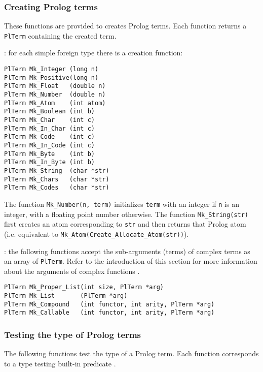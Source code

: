 \subsubsection{Creating Prolog terms}
These functions are provided to creates Prolog terms. Each function returns
a \texttt{PlTerm} containing the created term.

: for each simple foreign type
 there is a creation function:

\begin{Indentation}
\begin{verbatim}
PlTerm Mk_Integer (long n)
PlTerm Mk_Positive(long n)
PlTerm Mk_Float   (double n)
PlTerm Mk_Number  (double n)
PlTerm Mk_Atom    (int atom)
PlTerm Mk_Boolean (int b)
PlTerm Mk_Char    (int c)
PlTerm Mk_In_Char (int c)
PlTerm Mk_Code    (int c)
PlTerm Mk_In_Code (int c)
PlTerm Mk_Byte    (int b)
PlTerm Mk_In_Byte (int b)
PlTerm Mk_String  (char *str)
PlTerm Mk_Chars   (char *str)
PlTerm Mk_Codes   (char *str)
\end{verbatim}
\end{Indentation}

The function \texttt{Mk\_Number(n, term)} initializes \texttt{term} with an
integer if \texttt{n} is an integer, with a floating point number otherwise.
The function \texttt{Mk\_String(str)} first creates an atom corresponding to
\texttt{str} and then returns that Prolog atom (i.e. equivalent to
\texttt{Mk\_Atom(Create\_Allocate\_Atom(str))}).

: the following functions accept the sub-arguments
(terms) of complex terms as an array of \texttt{PlTerm}. Refer to the
introduction of this section for more information about the arguments of
complex functions .

\begin{Indentation}
\begin{verbatim}
PlTerm Mk_Proper_List(int size, PlTerm *arg)
PlTerm Mk_List       (PlTerm *arg)
PlTerm Mk_Compound   (int functor, int arity, PlTerm *arg)
PlTerm Mk_Callable   (int functor, int arity, PlTerm *arg)
\end{verbatim}
\end{Indentation}

\subsubsection{Testing the type of Prolog terms}
\label{Testing-the-type-of-Prolog-terms}
The following functions test the type of a Prolog term. Each function
corresponds to a type testing built-in predicate .

